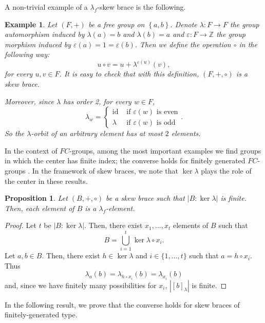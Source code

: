\documentclass{amsart}
\newcommand{\id}{\operatorname{id}}
\newtheorem{pro}[thm]{Proposition}
\newtheorem{exa}[thm]{Example}
\begin{document}
A non-trivial example of a $\lambda_f$-skew brace is the following.
\begin{exa}\label{exafree}
    Let $(F,+)$ be a free group on $\left\lbrace a,b \right\rbrace$.
    Denote $\lambda:F\rightarrow F$ the group automorphism induced by
    $\lambda(a)=b$ and $\lambda(b)=a$ 
    and $\varepsilon: F \rightarrow \mathbb{Z}$ the group morphism induced by 
    $\varepsilon(a)=1=\varepsilon(b)$.
    Then we define the operation $\circ$ in the following way:
    \[
    u\circ v=u+\lambda^{\varepsilon(u)}(v),
    \]
    for every $u,v\in F$.
    It is easy to check that with this definition, $(F,+,\circ)$ is a skew brace.
    
    Moreover, since $\lambda$ has order 2, for every $w\in F$,
    \[
    \lambda_w=\begin{cases}
        \id&\text{ if }\varepsilon(w)\text{ is even}\\
        \lambda&\text{ if }\varepsilon(w)\text{ is odd}
    \end{cases}.
    \]
    So the $\lambda$-orbit of an arbitrary element has at most $2$ elements.
\end{exa}



In the context of $FC$-groups, among the most important examples we find groups in which the center has finite index; the converse holds for finitely generated $FC$-groups \cite{neumann}. In the framework of skew  braces, we note that $\ker\lambda$ plays the role of the center in these results. 


 
\begin{pro}\label{lambdafkerfinite}
    Let $(B,+,\circ)$ be a skew brace such that $|B:\ker\lambda|$ is finite. Then, each element of $B$ is a $\lambda_f$-element.
\end{pro}
\begin{proof}
    Let $t$ be $|B:\ker\lambda|$. Then, there exist $x_1,...,x_t$ elements of $B$ such that $$B=\bigcup_{i=1}^t\ker\lambda\circ x_i.$$ Let $a,b\in B$. Then, there exist $h\in\ker\lambda$ and $i\in \{1,...,t\}$ such that $a=h\circ x_i$. Thus $$\lambda_a(b)=\lambda_{h\circ x_i}(b)=\lambda_{x_i}(b)$$ and, since we have finitely many possibilities for $x_i$, $\left|[b]_\lambda\right|$ is finite.
\end{proof}

In the following result, we prove that the converse holds for skew braces of finitely-generated type.
\end{document}

